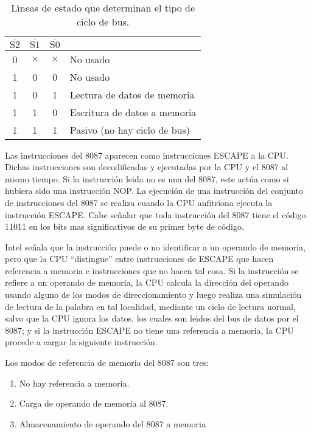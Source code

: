 \begin{table}[!htb]
\centering
\begin{tabular}{|c|c|c|l|} \hline
$\overline{\mbox{S2}}$ & $\overline{\mbox{S1}}$ & $\overline{\mbox{S0}}$ & \\ %
\hline
0 & $\times$ & $\times$ & No usado \\
1 & 0 & 0 & No usado \\
1 & 0 & 1 & Lectura de datos de memoria \\
1 & 1 & 0 & Escritura de datos a memoria \\
1 & 1 & 1 & Pasivo (no hay ciclo de bus) \\ \hline
\end{tabular}
\caption{L\'{\i}neas de estado que determinan el  tipo de ciclo de bus.}
\label{lineas}
\end{table}

Las instrucciones del 8087 aparecen como instrucciones ESCAPE a la CPU. Dichas instrucciones son %
decodificadas y ejecutadas por la CPU y el 8087 al mismo tiempo. Si la instrucci\'on leida no es %
una del 8087, este act\'ua como si hubiera sido una instrucci\'on NOP. La ejecuci\'on de una %
instrucci\'on del conjunto de instrucciones del 8087 se realiza cuando la CPU anfitriona ejecuta %
la instrucci\'on ESCAPE. Cabe se\~nalar que toda instrucci\'on del 8087 tiene el c\'odigo %
11011 en los bits mas significativos de su primer byte de c\'odigo. 

Intel se\~nala que la instrucci\'on puede o no identificar a un operando de memoria, pero que %
la CPU ``distingue'' entre instrucciones de ESCAPE que hacen referencia a memoria e %
instrucciones que no hacen tal cosa. Si la instrucci\'on se refiere a un operando de memoria, la %
CPU calcula la direcci\'on del operando usando alguno de los modos de direccionamiento y luego %
realiza una simulaci\'on de lectura de la palabra en tal localidad, mediante un ciclo de lectura %
normal, salvo que la CPU ignora los datos, los cuales son le\'{\i}dos del bus de datos por el %
8087; y si la instrucci\'on ESCAPE no tiene una referencia a memoria, la CPU procede a cargar la %
siguiente instrucci\'on.

Los modos de referencia de memoria del 8087 son tres:

\begin{enumerate}
\item No hay referencia a memoria.
\item Carga de operando de memoria al 8087.
\item Almacenamiento de operando del 8087 a memoria
\end{enumerate}


